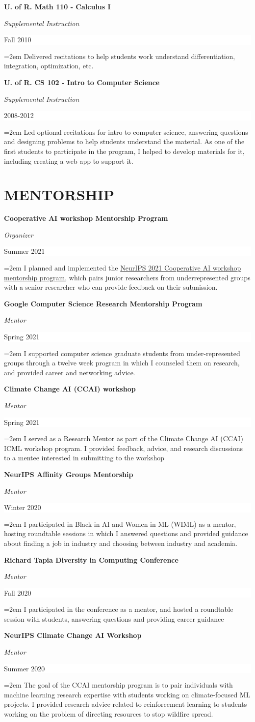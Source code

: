 \documentclass[paper=letter,fontsize=11pt]{scrartcl} %
\newcommand{\sepspace}{\vspace*{1em}}       %
\newcommand{\NewPart}[2]{\section*{\uppercase{#1} #2}}
\newcommand{\CourseEntry}[4]{
        \noindent \textbf{#1} \par
        \noindent \textit{#3} \hfill      %
        \colorbox{White}{%
            \parbox{6em}{%
            \hfill\color{Black}#2}} \par  %
        \noindent\hangindent=2em\hangafter=0 \small #4 %
        \normalsize \par}
\begin{document}
\CourseEntry{U. of R. Math 110 - Calculus I}{Fall 2010}{Supplemental Instruction}
{Delivered recitations to help students work understand differentiation, integration, optimization, etc.}
\sepspace

\CourseEntry{U. of R. CS 102 - Intro to Computer Science}{2008-2012}{Supplemental Instruction}
{Led optional recitations for intro to computer science, answering questions and designing problems to help students understand the material. As one of the first students to participate in the program, I helped to develop materials for it, including creating a web app to support it.}

\NewPart{Mentorship}{}
\CourseEntry{Cooperative AI workshop Mentorship Program}{Summer 2021}{Organizer}
{I planned and implemented the \href{https://www.cooperativeai.com/neurips-2021/workshop-information#h.ssihuuiopnhu}{NeurIPS 2021 Cooperative AI workshop mentorship program}, which pairs junior researchers from underrepresented groups with a senior researcher who can provide feedback on their submission.}
\sepspace

\CourseEntry{Google Computer Science Research Mentorship Program}{Spring 2021}{Mentor}
{I supported computer science graduate students from under-represented groups through a twelve week program in which I counseled them on research, and provided career and networking advice.}
\sepspace

\CourseEntry{Climate Change AI (CCAI) workshop}{Spring 2021}{Mentor}
{I served as a Research Mentor as part of the Climate Change AI (CCAI) ICML workshop program. I provided feedback, advice, and research discussions to a mentee interested in submitting to the workshop}
\sepspace

\CourseEntry{NeurIPS Affinity Groups Mentorship}{Winter 2020}{Mentor}
{I participated in Black in AI and Women in ML (WIML) as a mentor, hosting roundtable sessions in which I answered questions and provided guidance about finding a job in industry and choosing between industry and academia.}
\sepspace

\CourseEntry{Richard Tapia Diversity in Computing Conference}{Fall 2020}{Mentor}
{I participated in the conference as a mentor, and hosted a roundtable session with students, answering questions and providing career guidance}
\sepspace

\CourseEntry{NeurIPS Climate Change AI Workshop}{Summer 2020}{Mentor}
{The goal of the CCAI mentorship program is to pair individuals with machine learning research expertise with students working on climate-focused ML projects. I provided research advice related to reinforcement learning to students working on the problem of directing resources to stop wildfire spread.}
\sepspace
\end{document}
